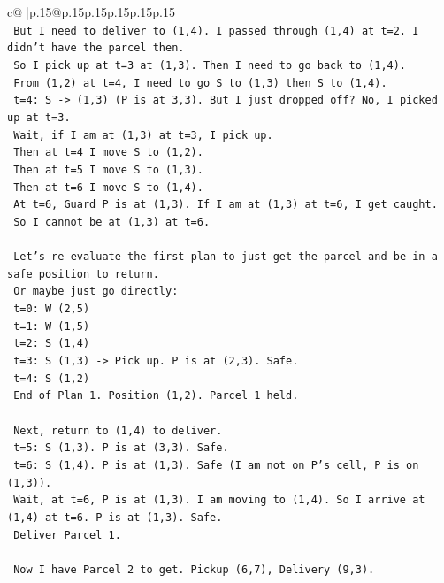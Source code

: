 \documentclass{article}
\begin{document}
{\begin{supertabular}{c@{$\;$}|p{.15\linewidth}@{}p{.15\linewidth}p{.15\linewidth}p{.15\linewidth}p{.15\linewidth}p{.15\linewidth}}
{{{\\ 
\texttt{   But I need to deliver to (1,4). I passed through (1,4) at t=2. I didn't have the parcel then.} \\
\texttt{   So I pick up at t=3 at (1,3). Then I need to go back to (1,4).} \\
\texttt{   From (1,2) at t=4, I need to go S to (1,3) then S to (1,4).} \\
\texttt{   t=4: S {-}> (1,3) (P is at 3,3). But I just dropped off? No, I picked up at t=3.} \\
\texttt{   Wait, if I am at (1,3) at t=3, I pick up.} \\
\texttt{   Then at t=4 I move S to (1,2).} \\
\texttt{   Then at t=5 I move S to (1,3).} \\
\texttt{   Then at t=6 I move S to (1,4).} \\
\texttt{   At t=6, Guard P is at (1,3). If I am at (1,3) at t=6, I get caught.} \\
\texttt{   So I cannot be at (1,3) at t=6.} \\
\\ 
\texttt{   Let's re{-}evaluate the first plan to just get the parcel and be in a safe position to return.} \\
\texttt{   Or maybe just go directly:} \\
\texttt{   t=0: W (2,5)} \\
\texttt{   t=1: W (1,5)} \\
\texttt{   t=2: S (1,4)} \\
\texttt{   t=3: S (1,3) {-}> Pick up. P is at (2,3). Safe.} \\
\texttt{   t=4: S (1,2)} \\
\texttt{   End of Plan 1. Position (1,2). Parcel 1 held.} \\
\\ 
\texttt{   Next, return to (1,4) to deliver.} \\
\texttt{   t=5: S (1,3). P is at (3,3). Safe.} \\
\texttt{   t=6: S (1,4). P is at (1,3). Safe (I am not on P's cell, P is on (1,3)).} \\
\texttt{   Wait, at t=6, P is at (1,3). I am moving to (1,4). So I arrive at (1,4) at t=6. P is at (1,3). Safe.} \\
\texttt{   Deliver Parcel 1.} \\
\\ 
\texttt{   Now I have Parcel 2 to get. Pickup (6,7), Delivery (9,3).} \\
}}}
\end{supertabular}}
\end{document}
